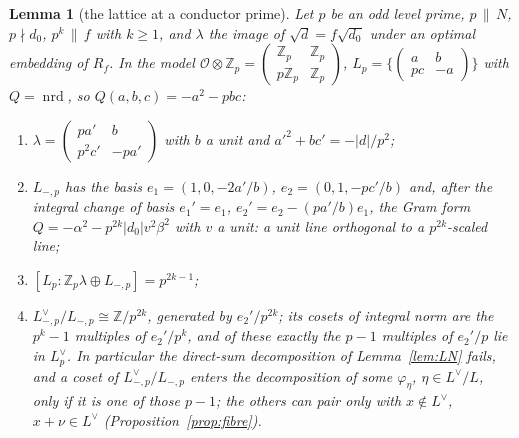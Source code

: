 \documentclass[11pt,reqno]{amsart}
\theoremstyle{plain}
\newtheorem{lemma}[theorem]{Lemma}
\theoremstyle{definition}
\DeclareMathOperator{\nrd}{nrd}
\newcommand{\Z}{\mathbb{Z}}
\newcommand{\Ldual}{L^{\vee}}
\begin{document}
\begin{lemma}[the lattice at a conductor prime]\label{lem:conductor}
Let $p$ be an odd level prime, $p\,\|\,N$, $p\nmid d_0$, $p^k\,\|\,f$ with $k\ge1$, and
$\lambda$ the image of $\sqrt d=f\sqrt{d_0}$ under an optimal embedding of $R_f$. In the model
$\mathcal O\otimes\Z_p=\begin{pmatrix}\Z_p&\Z_p\\p\Z_p&\Z_p\end{pmatrix}$, $L_p=\{\begin{pmatrix}
a&b\\pc&-a\end{pmatrix}\}$ with $Q=\nrd$, so $Q(a,b,c)=-a^2-pbc$:
\begin{enumerate}
\item $\lambda=\begin{pmatrix}pa'&b\\p^2c'&-pa'\end{pmatrix}$ with $b$ a unit and
$a'^2+bc'=-\lvert d\rvert/p^2$;
\item $L_{-,p}$ has the basis $e_1=(1,0,-2a'/b)$, $e_2=(0,1,-pc'/b)$ and, after the integral change
of basis $e_1'=e_1$, $e_2'=e_2-(pa'/b)e_1$, the Gram form
$Q=-\alpha^2-p^{2k}\lvert d_0\rvert v^2\beta^2$ with $v$ a unit: a unit line orthogonal to a
$p^{2k}$-scaled line;
\item $[L_p:\Z_p\lambda\oplus L_{-,p}]=p^{2k-1}$;
\item $L_{-,p}^\vee/L_{-,p}\cong\Z/p^{2k}$, generated by $e_2'/p^{2k}$; its cosets of integral norm are
the $p^k-1$ multiples of $e_2'/p^k$, and of these exactly the $p-1$ multiples of $e_2'/p$ lie in
$L_p^\vee$. In particular the direct-sum decomposition of Lemma~\ref{lem:LN} fails, and a coset of
$L_{-,p}^\vee/L_{-,p}$ enters the decomposition of some $\varphi_\eta$, $\eta\in\Ldual/L$, only if it
is one of those $p-1$; the others can pair only with $x\notin\Ldual$, $x+\nu\in\Ldual$
(Proposition~\ref{prop:fibre}).
\end{enumerate}
\end{lemma}
\end{document}
